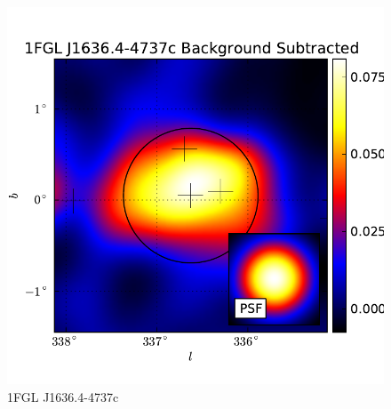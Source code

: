 \documentclass[preprint]{aastex}
\begin{document}
  \begin{figure}
    \begin{center}
      \includegraphics[type=pdf,ext=.pdf,read=.pdf]{source_plots/source_1FGL_J1636.4-4737c}
    \end{center}
    \caption{1FGL J1636.4-4737c}
  \end{figure}
\end{document}
